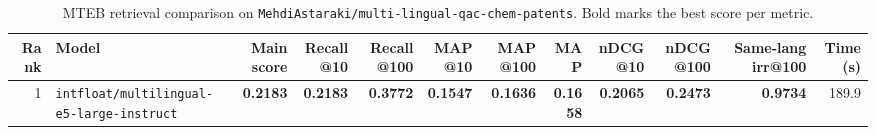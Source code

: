 \begin{table}[t]
\centering
\small
\begin{tabular}{r l r r r r r r r r r r}
\hline
Rank & Model & Main score & Recall@10 & Recall@100 & MAP@10 & MAP@100 & MAP & nDCG@10 & nDCG@100 & Same-lang irr@100 & Time (s) \\
\hline
1 & \texttt{intfloat/multilingual-e5-large-instruct} & \textbf{0.2183} & \textbf{0.2183} & \textbf{0.3772} & \textbf{0.1547} & \textbf{0.1636} & \textbf{0.1658} & \textbf{0.2065} & \textbf{0.2473} & \textbf{0.9734} & 189.9 \\
\hline
\end{tabular}
\caption{MTEB retrieval comparison on \texttt{MehdiAstaraki/multi-lingual-qac-chem-patents}. Bold marks the best score per metric.}
\label{tab:mteb-model-comparison}
\end{table}
